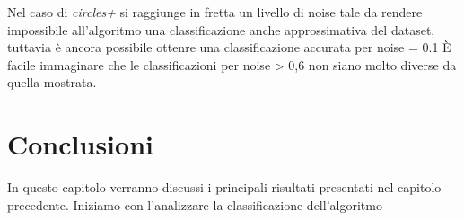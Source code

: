 \documentclass[12pt,a4paper]{report}
\begin{document}
Nel caso di \textit{circles+} si raggiunge in fretta un livello di noise tale da rendere impossibile all'algoritmo una classificazione anche approssimativa del dataset, tuttavia è ancora possibile ottenre una classificazione accurata per noise = 0.1
È facile immaginare che le classificazioni per noise > 0,6 non siano molto diverse da quella mostrata.

\chapter{Conclusioni}

In questo capitolo verranno discussi i principali risultati presentati nel capitolo precedente.
Iniziamo con l'analizzare la classificazione dell'algoritmo 

\listoffigures

\nocite{*}


\end{document}
